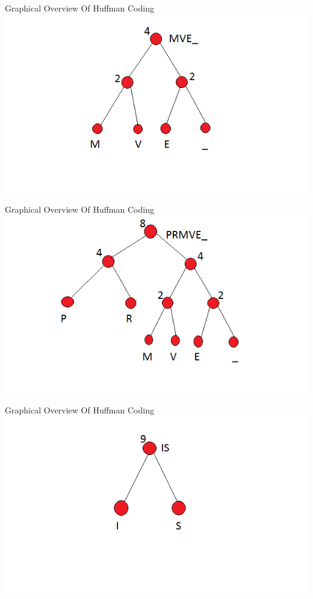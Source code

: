\documentclass[12pt]{beamer}
\begin{document}
\begin{frame}{Graphical Overview Of Huffman Coding}
\includegraphics[scale=0.6]{4}
\end{frame}

\begin{frame}{Graphical Overview Of Huffman Coding}
\includegraphics[scale=0.6]{5}
\end{frame}

\begin{frame}{Graphical Overview Of Huffman Coding}
\includegraphics[scale=0.6]{6}
\end{frame}
\end{document}
